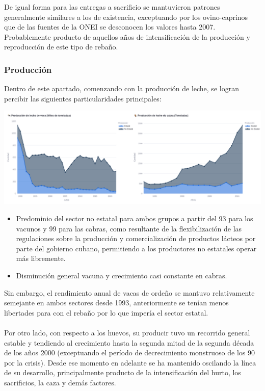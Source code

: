 \documentclass{article}
\begin{document}
De igual forma para las entregas a sacrificio se mantuvieron patrones generalmente similares a los de existencia, exceptuando por los ovino-caprinos que de las fuentes de la ONEI se desconocen los valores hasta 2007.
Probablemente producto de aquellos años de intensificación de la producción y reproducción de este tipo de rebaño.\\
\newpage
\subsubsection{Producción}
Dentro de este apartado, comenzando con la producción de leche, se logran percibir las siguientes particularidades principales:
\begin{center}
    \includegraphics[width=1.0\textwidth]{img/lechee.png}
\end{center}
\begin{itemize}
    \item Predominio del sector no estatal para ambos grupos a partir del 93 para los vacunos y 99 para las cabras, como resultante de la flexibilización de las regulaciones sobre la producción y comercialización de productos lácteos por parte del gobierno cubano, 
    permitiendo a los productores no estatales operar más libremente.
    \item Disminución general vacuna y crecimiento casi constante en cabras. 
\end{itemize}
Sin embargo, el rendimiento anual de vacas de ordeño se mantuvo relativamente semejante en ambos sectores desde 1993, anteriormente se tenían menos libertades para con el rebaño por lo que impería el sector estatal.\\\\
Por otro lado, con respecto a los huevos, su producir tuvo un recorrido general estable y tendiendo al crecimiento hasta la segunda mitad de la segunda década de los años 2000 (exceptuando el período de decrecimiento monstruoso de los 90 por la crisis). Desde ese momento en adelante se ha mantenido oscilando la línea de su desarrollo, principalmente producto de la intensificación del hurto, los sacrificios, la caza y demás factores.
\end{document}

